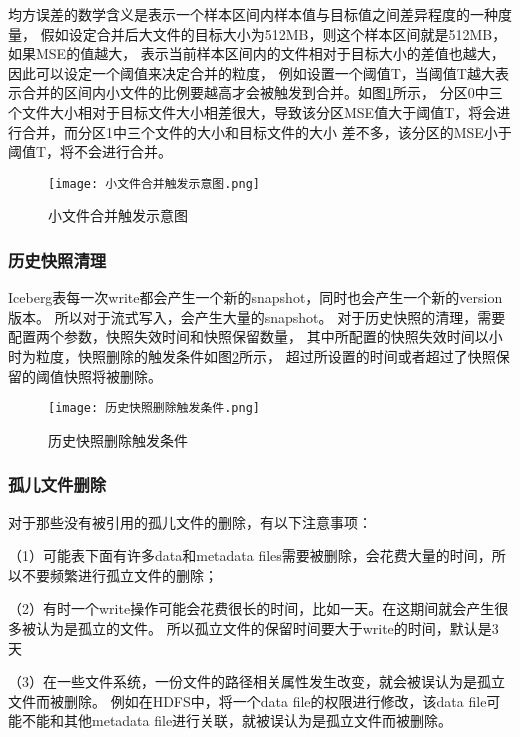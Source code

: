 均方误差的数学含义是表示一个样本区间内样本值与目标值之间差异程度的一种度量，
假如设定合并后大文件的目标大小为512MB，则这个样本区间就是512MB，如果MSE的值越大，
表示当前样本区间内的文件相对于目标大小的差值也越大，因此可以设定一个阈值来决定合并的粒度，
例如设置一个阈值T，当阈值T越大表示合并的区间内小文件的比例要越高才会被触发到合并。如图\ref{fig:小文件合并触发示意图}所示，
分区0中三个文件大小相对于目标文件大小相差很大，导致该分区MSE值大于阈值T，将会进行合并，而分区1中三个文件的大小和目标文件的大小
差不多，该分区的MSE小于阈值T，将不会进行合并。

\begin{figure}[H]
  \centering
  \texttt{[image: 小文件合并触发示意图.png]}
  \caption{小文件合并触发示意图}
  \label{fig:小文件合并触发示意图}
\end{figure}

\subsubsection{历史快照清理}

Iceberg表每一次write都会产生一个新的snapshot，同时也会产生一个新的version版本。
所以对于流式写入，会产生大量的snapshot。
对于历史快照的清理，需要配置两个参数，快照失效时间和快照保留数量，
其中所配置的快照失效时间以小时为粒度，快照删除的触发条件如图\ref{fig:历史快照删除触发条件}所示，
超过所设置的时间或者超过了快照保留的阈值快照将被删除。

\begin{figure}[H]
  \centering
  \texttt{[image: 历史快照删除触发条件.png]}
  \caption{历史快照删除触发条件}
  \label{fig:历史快照删除触发条件}
\end{figure}

\subsubsection{孤儿文件删除}

对于那些没有被引用的孤儿文件的删除，有以下注意事项：

（1）可能表下面有许多data和metadata files需要被删除，会花费大量的时间，所以不要频繁进行孤立文件的删除；

（2）有时一个write操作可能会花费很长的时间，比如一天。在这期间就会产生很多被认为是孤立的文件。
所以孤立文件的保留时间要大于write的时间，默认是3天

（3）在一些文件系统，一份文件的路径相关属性发生改变，就会被误认为是孤立文件而被删除。
例如在HDFS中，将一个data file的权限进行修改，该data file可能不能和其他metadata file进行关联，就被误认为是孤立文件而被删除。

